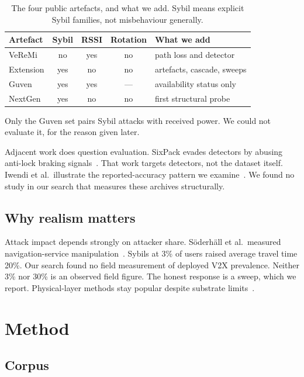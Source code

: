 \documentclass[conference]{IEEEtran}
\begin{document}
\begin{table}[t]
\caption{The four public artefacts, and what we add.
Sybil means explicit Sybil families, not misbehaviour generally.}
\label{tab:datasets}
\centering
\scriptsize
\begin{tabular}{@{}>{\raggedright\arraybackslash}p{1.7cm}ccc>{\raggedright\arraybackslash}p{2.0cm}@{}}
\toprule
Artefact & Sybil & RSSI & Rotation & What we add \\
\midrule
VeReMi \cite{heijden2018} & no & yes & no & path loss and detector \\
Extension \cite{kamel2020} & yes & no & no & artefacts, cascade, sweeps \\
Guven \cite{guven2024} & yes & yes & --- & availability status only \\
NextGen \cite{nextgen2026} & yes & no & no & first structural probe \\
\bottomrule
\end{tabular}
\end{table}

Only the Guven set pairs Sybil attacks with received power.
We could not evaluate it, for the reason given later.

Adjacent work does question evaluation.
SixPack evades detectors by abusing anti-lock braking signals~\cite{sixpack2021}.
That work targets detectors, not the dataset itself.
Iwendi et al.\ illustrate the reported-accuracy pattern we examine~\cite{iwendi2018}.
We found no study in our search that measures these archives structurally.

\subsection{Why realism matters}

Attack impact depends strongly on attacker share.
S\"oderh\"all et al.\ measured navigation-service manipulation~\cite{soderhall2025}.
Sybils at 3\% of users raised average travel time 20\%.
Our search found no field measurement of deployed V2X prevalence.
Neither 3\% nor 30\% is an observed field figure.
The honest response is a sweep, which we report.
Physical-layer methods stay popular despite substrate limits~\cite{taysi2025,almesaeed2025}.

\section{Method}

\subsection{Corpus}
\end{document}

